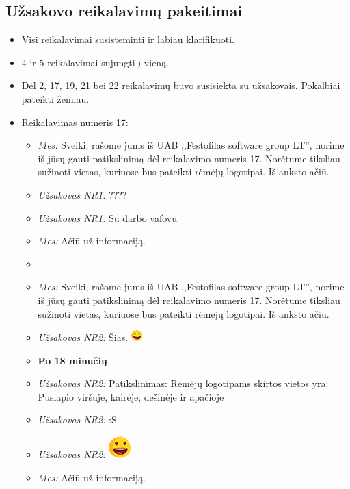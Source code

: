\documentclass{VUMIFPSkursinis}
\begin{document}
		\subsection{Užsakovo reikalavimų pakeitimai} 
			\begin{itemize}
				\item Visi reikalavimai susisteminti ir labiau klarifikuoti.
				\item 4 ir 5 reikalavimai sujungti į vieną.
				\item Dėl 2, 17, 19, 21 bei 22 reikalavimų buvo susisiekta su užsakovais. Pokalbiai pateikti žemiau.
				\item Reikalavimas numeris 17:
					\begin{itemize}
						\item \textit{Mes:} Sveiki, rašome jums iš UAB ,,Festofilas software group LT'', norime iš jūsų gauti patikslinimą dėl reikalavimo numeris 17. Norėtume tiksliau sužinoti vietas, kuriuose bus pateikti rėmėjų logotipai. Iš anksto ačiū.
						\item \textit{Užsakovas NR1:} ????
						\item \textit{Užsakovas NR1:} Su darbo vafovu
						\item \textit{Mes:} Ačiū už informaciją.
						\item[ ]
						\item \textit{Mes:} Sveiki, rašome jums iš UAB ,,Festofilas software group LT'', norime iš jūsų gauti patikslinimą dėl reikalavimo numeris 17. Norėtume tiksliau sužinoti vietas, kuriuose bus pateikti rėmėjų logotipai. Iš anksto ačiū.
						\item \textit{Užsakovas NR2:} Šias. \includegraphics{img/PSI4/smalllaugh.png}
						\item \textbf{Po 18 minučių}
						\item \textit{Užsakovas NR2:} Patikslinimas: Rėmėjų logotipams skirtos vietos yra: Puslapio viršuje, kairėje, dešinėje ir apačioje
						\item \textit{Užsakovas NR2:} :S
						\item \textit{Užsakovas NR2:} \includegraphics{img/PSI4/biglaugh.png}
						\item \textit{Mes:} Ačiū už informaciją.
					\end{itemize}	

\end{itemize}
\end{document}
